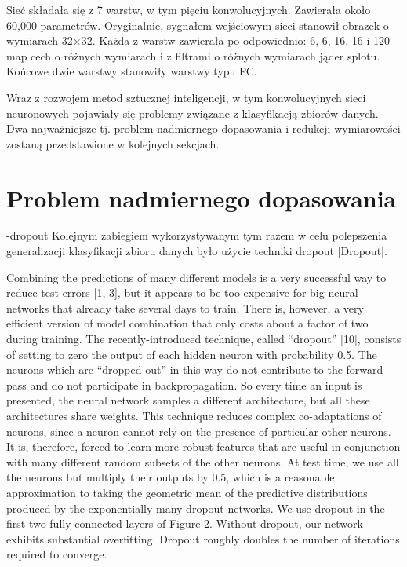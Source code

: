 Sieć składała się z 7 warstw, w tym pięciu konwolucyjnych. Zawierała około 60,000 parametrów. Oryginalnie, sygnałem wejściowym sieci stanowił obrazek o wymiarach 32$\times$32. Każda z warstw zawierała po odpowiednio: 6, 6, 16, 16 i 120 map cech o różnych wymiarach i z filtrami o różnych wymiarach jąder splotu. Końcowe dwie warstwy stanowiły warstwy typu FC. 

Wraz z rozwojem metod sztucznej inteligencji, w tym konwolucyjnych sieci neuronowych pojawiały się problemy związane z klasyfikacją zbiorów danych. Dwa najważniejsze tj. problem nadmiernego dopasowania i redukcji wymiarowości zostaną przedstawione w kolejnych sekcjach.

\section{Problem nadmiernego dopasowania}
\label{sec-overffiting}
-dropout
Kolejnym zabiegiem wykorzystywanym tym razem w celu polepszenia generalizacji klasyfikacji zbioru danych było użycie techniki dropout [Dropout].

Combining the predictions of many different models is a very successful way to reduce test errors
[1, 3], but it appears to be too expensive for big neural networks that already take several days
to train. There is, however, a very efficient version of model combination that only costs about a
factor of two during training. The recently-introduced technique, called “dropout” [10], consists
of setting to zero the output of each hidden neuron with probability 0.5. The neurons which are
“dropped out” in this way do not contribute to the forward pass and do not participate in backpropagation.
So every time an input is presented, the neural network samples a different architecture,
but all these architectures share weights. This technique reduces complex co-adaptations of neurons,
since a neuron cannot rely on the presence of particular other neurons. It is, therefore, forced to
learn more robust features that are useful in conjunction with many different random subsets of the
other neurons. At test time, we use all the neurons but multiply their outputs by 0.5, which is a
reasonable approximation to taking the geometric mean of the predictive distributions produced by
the exponentially-many dropout networks.
We use dropout in the first two fully-connected layers of Figure 2. Without dropout, our network exhibits
substantial overfitting. Dropout roughly doubles the number of iterations required to converge.

